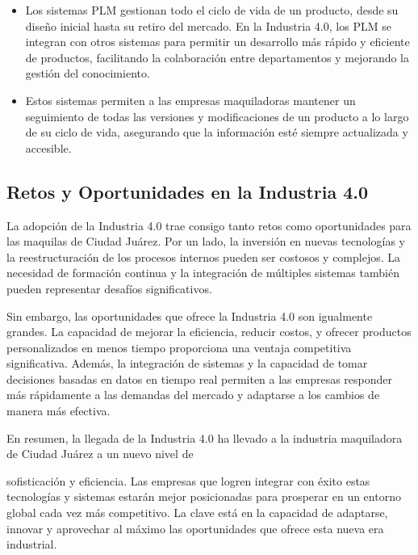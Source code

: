 \documentclass[
  10pt,
  letterpaper,
]{book}
\providecommand{\tightlist}{%
  \setlength{\itemsep}{0pt}\setlength{\parskip}{0pt}}\usepackage{longtable,booktabs,array}
\begin{document}
\begin{enumerate}
  \begin{itemize}
  \tightlist
  \item
    Los sistemas PLM gestionan todo el ciclo de vida de un producto,
    desde su diseño inicial hasta su retiro del mercado. En la Industria
    4.0, los PLM se integran con otros sistemas para permitir un
    desarrollo más rápido y eficiente de productos, facilitando la
    colaboración entre departamentos y mejorando la gestión del
    conocimiento.
  \item
    Estos sistemas permiten a las empresas maquiladoras mantener un
    seguimiento de todas las versiones y modificaciones de un producto a
    lo largo de su ciclo de vida, asegurando que la información esté
    siempre actualizada y accesible.
  \end{itemize}
\end{enumerate}

\subsection{Retos y Oportunidades en la Industria
4.0}\label{retos-y-oportunidades-en-la-industria-4.0}

La adopción de la Industria 4.0 trae consigo tanto retos como
oportunidades para las maquilas de Ciudad Juárez. Por un lado, la
inversión en nuevas tecnologías y la reestructuración de los procesos
internos pueden ser costosos y complejos. La necesidad de formación
continua y la integración de múltiples sistemas también pueden
representar desafíos significativos.

Sin embargo, las oportunidades que ofrece la Industria 4.0 son
igualmente grandes. La capacidad de mejorar la eficiencia, reducir
costos, y ofrecer productos personalizados en menos tiempo proporciona
una ventaja competitiva significativa. Además, la integración de
sistemas y la capacidad de tomar decisiones basadas en datos en tiempo
real permiten a las empresas responder más rápidamente a las demandas
del mercado y adaptarse a los cambios de manera más efectiva.

En resumen, la llegada de la Industria 4.0 ha llevado a la industria
maquiladora de Ciudad Juárez a un nuevo nivel de

sofisticación y eficiencia. Las empresas que logren integrar con éxito
estas tecnologías y sistemas estarán mejor posicionadas para prosperar
en un entorno global cada vez más competitivo. La clave está en la
capacidad de adaptarse, innovar y aprovechar al máximo las oportunidades
que ofrece esta nueva era industrial.
\end{document}
